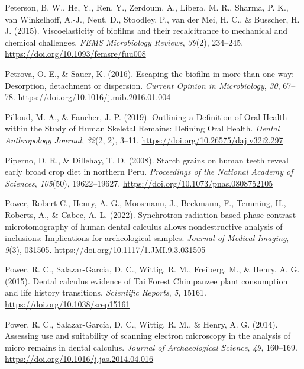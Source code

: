 \documentclass[
  letterpaper,
]{book}
\newlength{\cslhangindent}
\newlength{\cslentryspacingunit} %
\newenvironment{CSLReferences}[2] %
 {%
  \setlength{\parindent}{0pt}
  \ifodd #1
  \let\oldpar\par
  \def\par{\hangindent=\cslhangindent\oldpar}
  \fi
  \setlength{\parskip}{#2\cslentryspacingunit}
 }%
 {}
\begin{document}
\begin{CSLReferences}{1}{0}
\leavevmode{}%
Peterson, B. W., He, Y., Ren, Y., Zerdoum, A., Libera, M. R., Sharma, P.
K., van Winkelhoff, A.-J., Neut, D., Stoodley, P., van der Mei, H. C.,
\& Busscher, H. J. (2015). Viscoelasticity of biofilms and their
recalcitrance to mechanical and chemical challenges. \emph{FEMS
Microbiology Reviews}, \emph{39}(2), 234--245.
\url{https://doi.org/10.1093/femsre/fuu008}

\leavevmode{}%
Petrova, O. E., \& Sauer, K. (2016). Escaping the biofilm in more than
one way: Desorption, detachment or dispersion. \emph{Current Opinion in
Microbiology}, \emph{30}, 67--78.
\url{https://doi.org/10.1016/j.mib.2016.01.004}

\leavevmode{}%
Pilloud, M. A., \& Fancher, J. P. (2019). Outlining a {Definition} of
{Oral Health} within the {Study} of {Human Skeletal Remains}: {Defining
Oral Health}. \emph{Dental Anthropology Journal}, \emph{32}(2, 2),
3--11. \url{https://doi.org/10.26575/daj.v32i2.297}

\leavevmode{}%
Piperno, D. R., \& Dillehay, T. D. (2008). Starch grains on human teeth
reveal early broad crop diet in northern {Peru}. \emph{Proceedings of
the National Academy of Sciences}, \emph{105}(50), 19622--19627.
\url{https://doi.org/10.1073/pnas.0808752105}

\leavevmode{}%
Power, Robert C., Henry, A. G., Moosmann, J., Beckmann, F., Temming, H.,
Roberts, A., \& Cabec, A. L. (2022). Synchrotron radiation-based
phase-contrast microtomography of human dental calculus allows
nondestructive analysis of inclusions: Implications for archeological
samples. \emph{Journal of Medical Imaging}, \emph{9}(3), 031505.
\url{https://doi.org/10.1117/1.JMI.9.3.031505}

\leavevmode{}%
Power, R. C., Salazar-Garcia, D. C., Wittig, R. M., Freiberg, M., \&
Henry, A. G. (2015). Dental calculus evidence of {Tai Forest Chimpanzee}
plant consumption and life history transitions. \emph{Scientific
Reports}, \emph{5}, 15161. \url{https://doi.org/10.1038/srep15161}

\leavevmode{}%
Power, R. C., Salazar-García, D. C., Wittig, R. M., \& Henry, A. G.
(2014). Assessing use and suitability of scanning electron microscopy in
the analysis of micro remains in dental calculus. \emph{Journal of
Archaeological Science}, \emph{49}, 160--169.
\url{https://doi.org/10.1016/j.jas.2014.04.016}


\end{CSLReferences}
\end{document}
